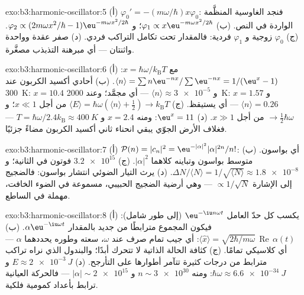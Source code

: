 \begin{solution}{exo:b3:harmonic-oscillator:5}
(أ) $\varphi_0' = -(m\omega/\hbar)x\varphi_0$: فنجد الغاوسية
المنظَّمة الواردة في النص. (ب) $\varphi_1 \propto x\eu^{-m\omega
x^2/2\hbar}$؛ و $\varphi_2 \propto (2m\omega x^2/\hbar -
1)\eu^{-m\omega x^2/2\hbar}$. (ج) $\varphi_0$ زوجية و $\varphi_1$ فردية:
فالمقدار تحت تكامل التراكب فردي. (د) صفر عقدة وواحدة واثنتان --- أي
مبرهنة التذبذب مصغَّرة.
\end{solution}

\begin{solution}{exo:b3:harmonic-oscillator:6}
(أ) مع $x = \hbar\omega/k_{\text{B}}T$: $\langle n\rangle =
\sum n\eu^{-nx}/\sum\eu^{-nx} = 1/(\eu^x - 1)$. (ب) أحادي أكسيد الكربون عند
\qty{300}{K}: $x = 10.4$ و $\langle n\rangle \approx \num{3e-5}$ ---
أي مجمَّد؛ وعند \qty{2000}{K}: $x = 1.57$ و $\langle n\rangle = 0.26$ ---
أي يستيقظ. (ج) $\langle E\rangle = \hbar\omega(\langle n\rangle +
\tfrac12) \to k_{\text{B}}T$ من أجل $x \ll 1$؛ و $\to \tfrac12\hbar
\omega$ من أجل $x \gg 1$. (د) $\eu^x = 11$: ومنه $x = 2.4$ و $T =
\hbar\omega/2.4k_{\text{B}} \approx \qty{400}{K}$ --- فغلاف الأرض
الجوّي يبقي انحناء ثاني أكسيد الكربون مضاءً جزئيًا.
\end{solution}

\begin{solution}{exo:b3:harmonic-oscillator:7}
(أ) $\mathcal P(n) = |c_n|^2 = \eu^{-|\alpha|^2}|\alpha|^{2n}/n!$:
أي بواسون. (ب) متوسط بواسون وتباينه كلاهما $|\alpha|^2$.
(ج) $\num{3.2e15}$ فوتون في الثانية؛ و $\Delta N/\langle N\rangle =
1/\sqrt{\langle N\rangle} \approx \num{1.8e-8}$. (د) يرث
التيار الضوئي انتشار بواسون: فالضجيج إلى الإشارة
$\propto 1/\sqrt N$ --- وهي أرضية الضجيج الحبيبي، مسموعة في الضوء
الخافت، مهملة في الساطع.
\end{solution}

\begin{solution}{exo:b3:harmonic-oscillator:8}
(أ) يكسب كل حدّ العامل $\eu^{-\iu n\omega t}$ (إلى طور شامل):
فيكون المجموع مترابطًا من جديد بالمقدار $\alpha\eu^{-\iu\omega t}$. (ب)
$\langle\hat x\rangle = \sqrt{2\hbar/m\omega}\,
\operatorname{Re}\,\alpha(t)$: أي جيب تمام صرف عند $\omega$، سعته
وطوره يحددهما $\alpha$ --- أي كلاسيكي تمامًا. (ج) كثافة الحالة
الذاتية لا تتحرك أبدًا؛ والبندول الذي نراه تراكب مترابط
من درجات كثيرة تتآمر أطوارها على التأرجح. (د) $E
\approx \qty{2e-3}{J}$ و $\hbar\omega \approx \qty{6.6e-34}{J}$: ومنه $n
\sim \num{3e30}$ و $|\alpha| \sim \num{2e15}$ --- فالحركة العيانية
ترابط بأعداد كمومية فلكية.
\end{solution}

